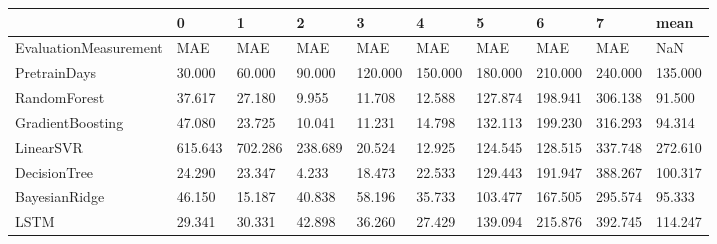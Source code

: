 \begin{tabular}{llllllllll}
\toprule
{} &       0 &       1 &       2 &       3 &       4 &       5 &       6 &       7 &    mean \\
\midrule
EvaluationMeasurement &     MAE &     MAE &     MAE &     MAE &     MAE &     MAE &     MAE &     MAE &     NaN \\
PretrainDays          &  30.000 &  60.000 &  90.000 & 120.000 & 150.000 & 180.000 & 210.000 & 240.000 & 135.000 \\
RandomForest          &  37.617 &  27.180 &   9.955 &  11.708 &  12.588 & 127.874 & 198.941 & 306.138 &  91.500 \\
GradientBoosting      &  47.080 &  23.725 &  10.041 &  11.231 &  14.798 & 132.113 & 199.230 & 316.293 &  94.314 \\
LinearSVR             & 615.643 & 702.286 & 238.689 &  20.524 &  12.925 & 124.545 & 128.515 & 337.748 & 272.610 \\
DecisionTree          &  24.290 &  23.347 &   4.233 &  18.473 &  22.533 & 129.443 & 191.947 & 388.267 & 100.317 \\
BayesianRidge         &  46.150 &  15.187 &  40.838 &  58.196 &  35.733 & 103.477 & 167.505 & 295.574 &  95.333 \\
LSTM                  &  29.341 &  30.331 &  42.898 &  36.260 &  27.429 & 139.094 & 215.876 & 392.745 & 114.247 \\
\bottomrule
\end{tabular}
